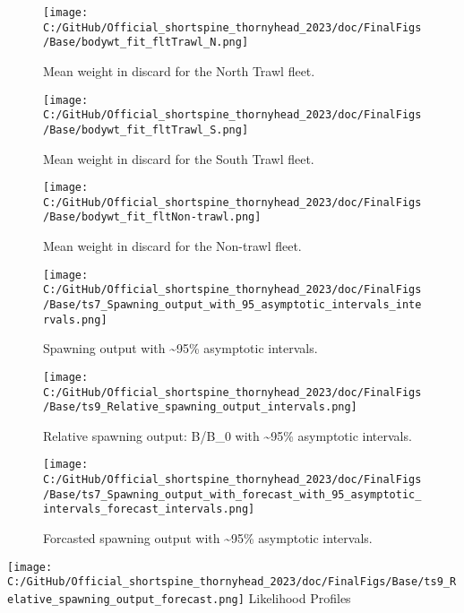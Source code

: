 \documentclass[11pt,
  english,
  letterpaper,
]{article}
\begin{document}
\begin{figure}
\centering
\texttt{[image: C:/GitHub/Official\_shortspine\_thornyhead\_2023/doc/FinalFigs/Base/bodywt\_fit\_fltTrawl\_N.png]}
\caption{Mean weight in discard for the North Trawl fleet.\label{fig:weightNorthTrl}}
\end{figure}

\begin{figure}
\centering
\texttt{[image: C:/GitHub/Official\_shortspine\_thornyhead\_2023/doc/FinalFigs/Base/bodywt\_fit\_fltTrawl\_S.png]}
\caption{Mean weight in discard for the South Trawl fleet.\label{fig:weightSouthTrl}}
\end{figure}

\begin{figure}
\centering
\texttt{[image: C:/GitHub/Official\_shortspine\_thornyhead\_2023/doc/FinalFigs/Base/bodywt\_fit\_fltNon-trawl.png]}
\caption{Mean weight in discard for the Non-trawl fleet.\label{fig:weightNonTrl}}
\end{figure}

\begin{figure}
\centering
\texttt{[image: C:/GitHub/Official\_shortspine\_thornyhead\_2023/doc/FinalFigs/Base/ts7\_Spawning\_output\_with\_95\_asymptotic\_intervals\_intervals.png]}
\caption{Spawning output with \textasciitilde95\% asymptotic intervals.\label{fig:spawnout}}
\end{figure}

\begin{figure}
\centering
\texttt{[image: C:/GitHub/Official\_shortspine\_thornyhead\_2023/doc/FinalFigs/Base/ts9\_Relative\_spawning\_output\_intervals.png]}
\caption{Relative spawning output: B/B\_0 with \textasciitilde95\% asymptotic intervals.\label{fig:relspawnout}}
\end{figure}

\begin{figure}
\centering
\texttt{[image: C:/GitHub/Official\_shortspine\_thornyhead\_2023/doc/FinalFigs/Base/ts7\_Spawning\_output\_with\_forecast\_with\_95\_asymptotic\_intervals\_forecast\_intervals.png]}
\caption{Forcasted spawning output with \textasciitilde95\% asymptotic intervals.\label{fig:spawnnout_forcast}}
\end{figure}

\texttt{[image: C:/GitHub/Official\_shortspine\_thornyhead\_2023/doc/FinalFigs/Base/ts9\_Relative\_spawning\_output\_forecast.png]} Likelihood Profiles
\end{document}

